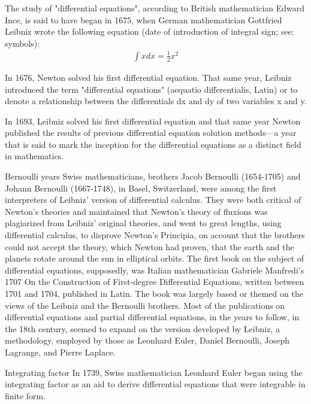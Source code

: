 \documentclass[12pt]{report}
\begin{document}
\par The study of "differential equations", according to British mathematician Edward Ince, is said to have began in 1675, when German mathematician Gottfried Leibniz wrote the following equation (date of introduction of integral sign; see: symbols):
\begin{align*}
\int x dx = \frac {1}{2}x^2
\end{align*}
\par In 1676, Newton solved his first differential equation. That same year, Leibniz introduced the term "differential equations" (aequatio differentialis, Latin) or to denote a relationship between the differentials dx and dy of two variables x and y.

In 1693, Leibniz solved his first differential equation and that same year Newton published the results of previous differential equation solution methods—a year that is said to mark the inception for the differential equations as a distinct field in mathematics.

\par Bernoulli years
Swiss mathematicians, brothers Jacob Bernoulli (1654-1705) and Johann Bernoulli (1667-1748), in Basel, Switzerland, were among the first interpreters of Leibniz' version of differential calculus. They were both critical of Newton's theories and maintained that Newton’s theory of fluxions was plagiarized from Leibniz' original theories, and went to great lengths, using differential calculus, to disprove Newton’s Principia, on account that the brothers could not accept the theory, which Newton had proven, that the earth and the planets rotate around the sun in elliptical orbits. The first book on the subject of differential equations, supposedly, was Italian mathematician Gabriele Manfredi’s 1707 On the Construction of First-degree Differential Equations, written between 1701 and 1704, published in Latin. The book was largely based or themed on the views of the Leibniz and the Bernoulli brothers. Most of the publications on differential equations and partial differential equations, in the years to follow, in the 18th century, seemed to expand on the version developed by Leibniz, a methodology, employed by those as Leonhard Euler, Daniel Bernoulli, Joseph Lagrange, and Pierre Laplace.

\par Integrating factor
In 1739, Swiss mathematician Leonhard Euler began using the integrating factor as an aid to derive differential equations that were integrable in finite form.
\end{document}

